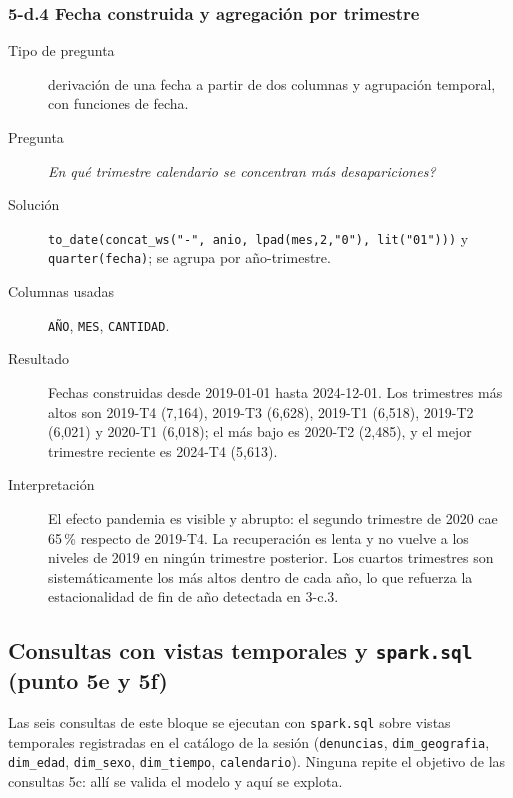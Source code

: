 \subsubsection*{5-d.4 \textbar{} Fecha construida y agregaci\'on por trimestre}
\begin{description}
\item[Tipo de pregunta] derivaci\'on de una fecha a partir de dos columnas y agrupaci\'on
      temporal, con funciones de fecha.
\item[Pregunta] \emph{En qu\'e trimestre calendario se concentran m\'as desapariciones?}
\item[Soluci\'on] \texttt{to\_date(concat\_ws("-", anio, lpad(mes,2,"0"), lit("01")))} y
      \texttt{quarter(fecha)}; se agrupa por a\~no-trimestre.
\item[Columnas usadas] \texttt{A\~NO}, \texttt{MES}, \texttt{CANTIDAD}.
\item[Resultado] Fechas construidas desde 2019-01-01 hasta 2024-12-01. Los trimestres m\'as altos
      son 2019-T4 (7,164), 2019-T3 (6,628), 2019-T1 (6,518), 2019-T2 (6,021) y 2020-T1 (6,018);
      el m\'as bajo es 2020-T2 (2,485), y el mejor trimestre reciente es 2024-T4 (5,613).
\item[Interpretaci\'on] El efecto pandemia es visible y abrupto: el segundo trimestre de 2020 cae
      65\,\% respecto de 2019-T4. La recuperaci\'on es lenta y no vuelve a los niveles de 2019 en
      ning\'un trimestre posterior. Los cuartos trimestres son sistem\'aticamente los m\'as altos
      dentro de cada a\~no, lo que refuerza la estacionalidad de fin de a\~no detectada en 3-c.3.
\end{description}

\subsection{Consultas con vistas temporales y \texttt{spark.sql} (punto 5e y 5f)}

Las seis consultas de este bloque se ejecutan con \texttt{spark.sql} sobre vistas temporales
registradas en el cat\'alogo de la sesi\'on (\texttt{denuncias}, \texttt{dim\_geografia},
\texttt{dim\_edad}, \texttt{dim\_sexo}, \texttt{dim\_tiempo}, \texttt{calendario}). Ninguna
repite el objetivo de las consultas 5c: all\'i se valida el modelo y aqu\'i se explota.

